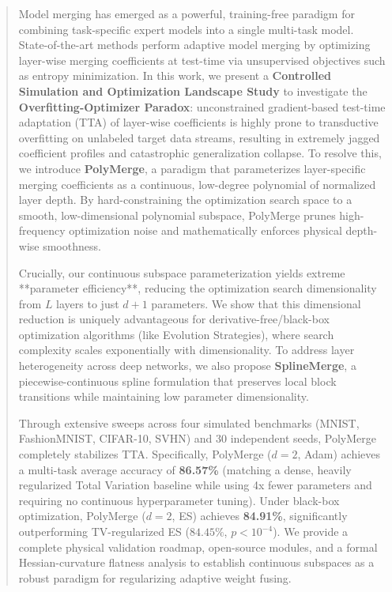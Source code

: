 \begin{abstract}
Model merging has emerged as a powerful, training-free paradigm for combining
task-specific expert models into a single multi-task model. State-of-the-art
methods perform adaptive model merging by optimizing layer-wise merging
coefficients at test-time via unsupervised objectives such as entropy minimization.
In this work, we present a \textbf{Controlled Simulation and Optimization Landscape
Study} to investigate the \textbf{Overfitting-Optimizer Paradox}: unconstrained
gradient-based test-time adaptation (TTA) of layer-wise coefficients is highly
prone to transductive overfitting on unlabeled target data streams, resulting
in extremely jagged coefficient profiles and catastrophic generalization collapse.
To resolve this, we introduce \textbf{PolyMerge}, a paradigm that parameterizes
layer-specific merging coefficients as a continuous, low-degree polynomial of
normalized layer depth. By hard-constraining the optimization search space to
a smooth, low-dimensional polynomial subspace, PolyMerge prunes high-frequency
optimization noise and mathematically enforces physical depth-wise smoothness. 

Crucially, our continuous subspace parameterization yields extreme **parameter
efficiency**, reducing the optimization search dimensionality from $L$ layers to
just $d+1$ parameters. We show that this dimensional reduction is uniquely
advantageous for derivative-free/black-box optimization algorithms (like Evolution
Strategies), where search complexity scales exponentially with dimensionality. To
address layer heterogeneity across deep networks, we also propose \textbf{SplineMerge},
a piecewise-continuous spline formulation that preserves local block transitions
while maintaining low parameter dimensionality.

Through extensive sweeps across four simulated benchmarks (MNIST, FashionMNIST, CIFAR-10, SVHN) and 30 independent seeds, PolyMerge completely stabilizes TTA. Specifically,
PolyMerge ($d=2$, Adam) achieves a multi-task average accuracy of \textbf{86.57\%}
(matching a dense, heavily regularized Total Variation baseline while using 4x fewer
parameters and requiring no continuous hyperparameter tuning). Under black-box
optimization, PolyMerge ($d=2$, ES) achieves \textbf{84.91\%}, significantly outperforming
TV-regularized ES ($84.45\%$, $p < 10^{-4}$). We provide a complete physical validation
roadmap, open-source modules, and a formal Hessian-curvature flatness analysis to
establish continuous subspaces as a robust paradigm for regularizing adaptive weight fusing.
\end{abstract}
